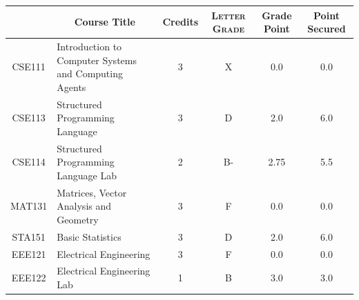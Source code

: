 \documentclass[11pt]{article}
\newcommand*{\numtwo}[1]{\pgfmathprintnumber[
                    fixed, precision=2, fixed zerofill=true]{#1}}
\begin{document}
                \begin{center}
                    \renewcommand{\arraystretch}{1.08}
                    
                \begin{tabular}{|c|l|c|>{\scshape}c|c|c|}
                \hline  \rule[-1ex]{0pt}{3.5ex} {\centering{\bf Course Code}} &  \multicolumn{1}{c|}{\textbf{Course Title}}  & {\bf Credits} & {\bf Letter Grade} & {\bf Grade Point} & {\bf Point Secured}  \\ 
                \hline   CSE111 &  Introduction to Computer Systems and Computing Agents		 & 3 & X & 0.0 & 0.0 \\ %
                \hline   CSE113 &  Structured Programming Language		 & 3 & D & 2.0 & 6.0 \\ %
                \hline   CSE114 &  Structured Programming Language Lab		 & 2 & B- & 2.75 & 5.5 \\ %
                \hline   MAT131 &  Matrices, Vector Analysis and Geometry		 & 3 & F & 0.0 & 0.0 \\ %
                \hline   STA151 &  Basic Statistics		 & 3 & D & 2.0 & 6.0 \\ %
                \hline   EEE121 &  Electrical Engineering		 & 3 & F & 0.0 & 0.0 \\ %
                \hline   EEE122 &  Electrical Engineering Lab		 & 1 & B & 3.0 & 3.0 \\ %

\hline                %
                \end{tabular}
                \end{center}
                \renewcommand{\arraystretch}{1.03}
\end{document}
